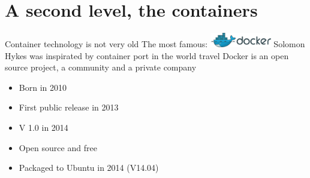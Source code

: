\section{A second level, the containers}
\begin{frame}
Container technology is not very old \newline
\vspace{0.5cm}
The most famous: \includegraphics[width=0.2\textwidth]{images/docker_logo2.png} \newline
\vspace{0.5cm}
Solomon Hykes was inspirated by container port in the world travel \newline
\vspace{0.5cm}
 \newline
Docker is an open source project, a community and a private company 
\end{frame}

\begin{frame}
\begin{itemize}
\item Born in 2010
\item First public release in 2013
\item V 1.0 in 2014
\item Open source and free
\item Packaged to Ubuntu in 2014 (V14.04)
\end{itemize}
\end{frame}

